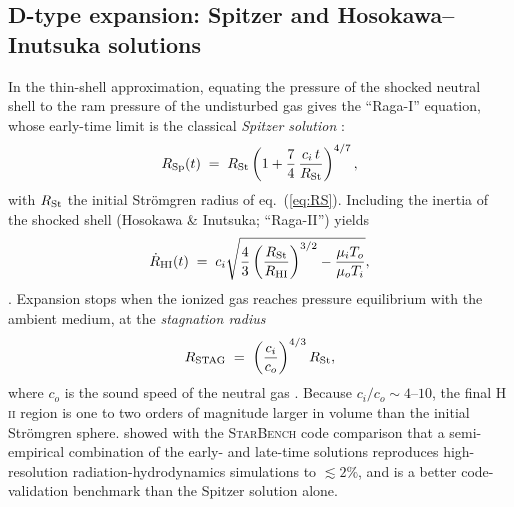 \documentclass[11pt,a4paper]{article}
\newcommand{\ion}[2]{\textrm{#1\,\textsc{#2}}}
\begin{document}
\subsection{D-type expansion: Spitzer and Hosokawa--Inutsuka solutions}
In the thin-shell approximation, equating the pressure of the shocked neutral shell to the ram
pressure of the undisturbed gas gives the ``Raga-I'' equation, whose early-time limit is the
classical \emph{Spitzer solution} \citep[eq.~9]{Bisbas2015}:
\begin{equation}
  R_{\rm Sp}(t) \;=\; R_{\rm St}\left(1+\frac{7}{4}\,\frac{c_i\,t}{R_{\rm St}}\right)^{4/7},
  \label{eq:spitzer}
\end{equation}
with $R_{\rm St}$ the initial Str\"omgren radius of eq.~(\ref{eq:RS}). Including the inertia of the
shocked shell (Hosokawa \& Inutsuka; ``Raga-II'') yields
\begin{equation}
  \dot R_{\rm HI}(t) \;=\; c_i\sqrt{\frac{4}{3}\left(\frac{R_{\rm St}}{R_{\rm HI}}\right)^{3/2}
  -\frac{\mu_i T_o}{\mu_o T_i}},
  \label{eq:HI}
\end{equation}
\citep[eq.~12]{Bisbas2015}. Expansion stops when the ionized gas reaches pressure equilibrium with
the ambient medium, at the \emph{stagnation radius}
\begin{equation}
  R_{\rm STAG} \;=\; \left(\frac{c_i}{c_o}\right)^{4/3} R_{\rm St},
  \label{eq:stag}
\end{equation}
where $c_o$ is the sound speed of the neutral gas \citep[eqs.~14 and 22]{Bisbas2015}. Because
$c_i/c_o\sim4$--$10$, the final \ion{H}{ii} region is one to two orders of magnitude larger in volume
than the initial Str\"omgren sphere. \citet{Bisbas2015} showed with the \textsc{StarBench} code
comparison that a semi-empirical combination of the early- and late-time solutions reproduces
high-resolution radiation-hydrodynamics simulations to $\lesssim2\%$, and is a better code-validation
benchmark than the Spitzer solution alone.
\end{document}
